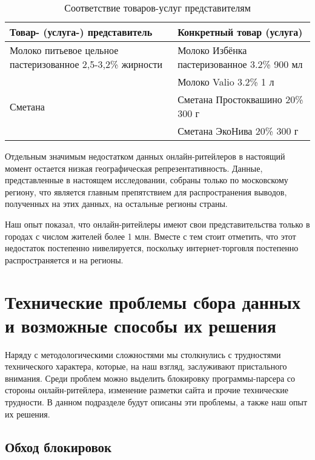 \begin{table}[h]
    \centering
    \caption{Соответствие товаров-услуг представителям}
    \begin{tabularx}{\textwidth}{@{}XX@{}}
        \toprule
       
        \textbf{Товар- (услуга-) представитель} & \textbf{Конкретный товар (услуга)} \\ \midrule
        Молоко питьевое цельное пастеризованное 2,5-3,2\% жирности & Молоко Избёнка пастеризованное 3.2\% 900 мл \\ 
        & Молоко Valio 3.2\% 1 л \\ \midrule
        Сметана & Сметана Простоквашино 20\% 300 г \\ 
        & Сметана ЭкоНива 20\% 300 г \\ 
        \bottomrule
    \end{tabularx}
    
    \label{tab:products}
\end{table}



Отдельным значимым недостатком данных онлайн-ритейлеров в настоящий момент остается низкая географическая репрезентативность. Данные, представленные в настоящем исследовании, собраны только по московскому региону, что является главным препятствием для распространения выводов, полученных на этих данных, на остальные регионы страны.

Наш опыт показал, что онлайн-ритейлеры имеют свои представительства только в городах с числом жителей более 1 млн. Вместе с тем стоит отметить, что этот недостаток постепенно нивелируется, поскольку интернет-торговля постепенно распространяется и на регионы.

\section{Технические проблемы сбора данных и возможные способы их решения}\label{sec:ch2/sec3}

Наряду с методологическими сложностями мы столкнулись с трудностями технического характера, которые, на наш взгляд, заслуживают пристального внимания. Среди проблем можно выделить блокировку программы-парсера со стороны онлайн-ритейлера, изменение разметки сайта и прочие технические трудности. В данном подразделе будут описаны эти проблемы, а также наш опыт их решения.

\subsection{Обход блокировок}\label{subsec:ch2/sec3/sub1}

